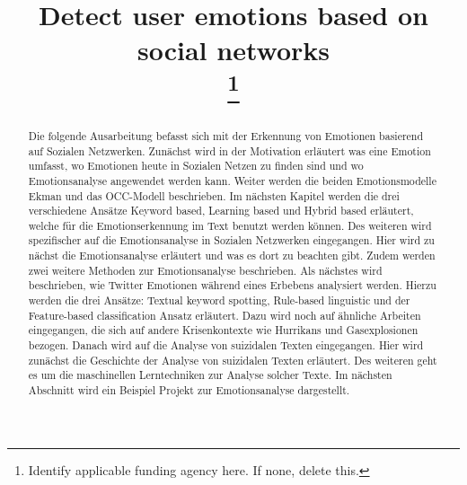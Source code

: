 \documentclass[conference]{IEEEtran}
\begin{document}
\title{Detect user emotions based on social networks\\
\thanks{Identify applicable funding agency here. If none, delete this.}
}

\author{
}

\maketitle

\begin{abstract}
\newline
Die folgende Ausarbeitung befasst sich mit der Erkennung von Emotionen basierend auf Sozialen Netzwerken.
Zunächst wird in der Motivation erläutert was eine Emotion umfasst, wo Emotionen heute in Sozialen Netzen zu finden sind und wo Emotionsanalyse angewendet werden kann.
Weiter werden die beiden Emotionsmodelle Ekman und das OCC-Modell beschrieben.
Im nächsten Kapitel werden die drei verschiedene Ansätze Keyword based, Learning based und Hybrid based erläutert, welche für die Emotionserkennung im Text benutzt werden können.
Des weiteren wird spezifischer auf die Emotionsanalyse in Sozialen Netzwerken eingegangen. Hier wird zu nächst die Emotionsanalyse erläutert und was es dort zu beachten gibt. Zudem werden zwei weitere Methoden zur Emotionsanalyse beschrieben.
Als nächstes wird beschrieben, wie Twitter Emotionen während eines Erbebens analysiert werden. Hierzu werden die drei Ansätze: Textual keyword spotting, Rule-based linguistic und der Feature-based classification Ansatz erläutert.
Dazu wird noch auf ähnliche Arbeiten eingegangen, die sich auf andere Krisenkontexte wie Hurrikans und Gasexplosionen bezogen.
Danach wird auf die Analyse von suizidalen Texten eingegangen. Hier wird zunächst die Geschichte der Analyse von suizidalen Texten erläutert. Des weiteren geht es um die maschinellen Lerntechniken zur Analyse solcher Texte.
Im nächsten Abschnitt wird ein Beispiel Projekt zur Emotionsanalyse dargestellt.
\end{abstract}
\end{document}
